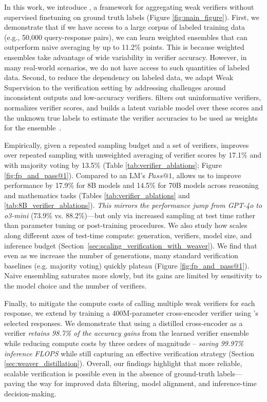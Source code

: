 In this work, we introduce \weaver{}, a framework for aggregating weak verifiers without supervised finetuning on ground truth labels (Figure \ref{fig:main_figure}). 
First, we demonstrate that if we have access to a large corpus of labeled training data (e.g., 50,000 query-response pairs), we can learn weighted ensembles that can outperform naive averaging by up to 11.2\% points. This is because weighted ensembles take advantage of wide variability in verifier accuracy. However, in many real-world scenarios, we do not have access to such quantities of labeled data.
Second, to reduce the dependency on labeled data, we adapt Weak Supervision to the verification setting by addressing challenges around inconsistent outputs and low-accuracy verifiers. 
\weaver{} filters out uninformative verifiers, normalizes verifier scores, and builds a latent variable model over these scores and the unknown true labels to estimate the verifier accuracies to be used as weights for the ensemble~\citep{ratner2016data, hall2003generalized}.

Empirically, given a repeated sampling budget and a set of verifiers, \weaver{} improves over repeated sampling with unweighted averaging of verifier scores by 17.1\% and with majority voting by 13.5\% (Table \ref{tab:verifier_ablations}; Figure \ref{fig:fp_and_pass@1}).
Compared to an LM's $Pass@1$, \weaver{} allows us to improve performance by 17.9\% for 8B models and 14.5\% for 70B models across reasoning and mathematics tasks (Tables \ref{tab:verifier_ablations} and \ref{tab:8B_verifier_ablations}).
\textit{This mirrors the performance jump from GPT-4o to o3-mini} (73.9\% vs. 88.2\%)---but only via increased sampling at test time rather than parameter tuning or post-training procedures. 
We also study how \weaver{} scales along different axes of test-time compute: generation, verifiers, model size, and inference budget (Section~\ref{sec:scaling_verification_with_weaver}). 
We find that even as we increase the number of generations, many standard verification baselines (e.g. majority voting) quickly plateau (Figure \ref{fig:fp_and_pass@1}). 
Naive ensembling saturates more slowly, but its gains are limited by sensitivity to the model choice and the number of verifiers. 

Finally, to mitigate the compute costs of calling multiple weak verifiers for each response, we extend \weaver{} by training a 400M-parameter cross-encoder verifier using \weaver{}'s selected responses.
We demonstrate that using a distilled \weaver{} cross-encoder as a verifier \textit{retains 98.7\% of the accuracy gains} from the learned verifier ensemble  while reducing compute costs by three orders of magnitude -- \textit{saving 99.97\% inference FLOPS} while still capturing an effective verification strategy (Section \ref{sec:weaver_distillation}). 
Overall, our findings highlight that more reliable, scalable verification is possible even in the absence of ground-truth labels---paving the way for improved data filtering, model alignment, and inference-time decision-making. 
